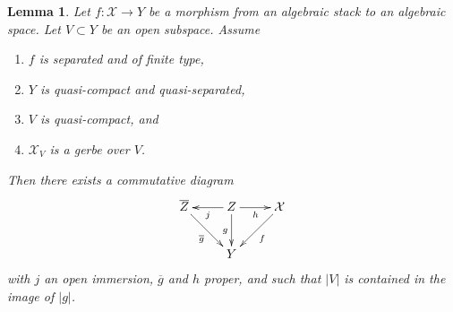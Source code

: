 \documentclass[10pt,a4paper]{amsart}
\theoremstyle{plain}
\newtheorem{lemma}[subsection]{Lemma}
\theoremstyle{definition}
\theoremstyle{remark}
\numberwithin{equation}{subsection}
\begin{document}
\begin{lemma}
\label{lemma-make-section}
Let $f : \mathcal{X} \to Y$ be a morphism from an algebraic stack
to an algebraic space. Let $V \subset Y$ be an open subspace.
Assume
\begin{enumerate}
\item $f$ is separated and of finite type,
\item $Y$ is quasi-compact and quasi-separated,
\item $V$ is quasi-compact, and
\item $\mathcal{X}_V$ is a gerbe over $V$.
\end{enumerate}
Then there exists a commutative diagram
$$
\xymatrix{
\overline{Z} \ar[rd]_{\overline{g}} &
Z \ar[l]^j \ar[d]_g \ar[r]_h & \mathcal{X} \ar[ld]^f \\
& Y
}
$$
with $j$ an open immersion, $\overline{g}$ and $h$ proper,
and such that $|V|$ is contained in the image of $|g|$.
\end{lemma}
\end{document}
